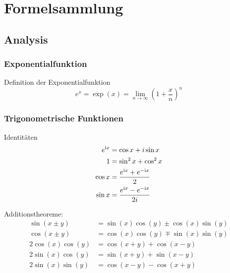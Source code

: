 \section{Formelsammlung}
	\subsection{Analysis}
		\subsubsection{Exponentialfunktion}
			\noindent
			Definition der Exponentialfunktion
			\begin{equation}
				e^x=\exp{(x)}=\lim_{n\rightarrow \infty}\left(1+\frac{x}{n}\right)^n
			\end{equation}

		\subsubsection{Trigonometrische Funktionen}
			\noindent
			Identitäten
			\begin{equation}
				\begin{split}
					e^{\mathrm{i} x}&=\cos x+i\sin x \\
					1&=\sin^{2}x+\cos^{2}x \\
					\cos{x}&=\frac{e^{\mathrm{i} x}+e^{-\mathrm{i} x}}{2} \\
					\sin{ x}&=\frac{e^{\mathrm{i} x}-e^{-\mathrm{i} x}}{2i} \\
				\end{split}
			\end{equation}

			\noindent

			Additionstheoreme:
			\begin{equation}
				\begin{split}
					\sin\left( x\pm y\right)&=\sin\left( x\right)\cos\left( y\right)\pm\cos\left( x\right)\sin\left( y\right) \\
					\cos\left( x\pm y\right)&=\cos\left( x\right)\cos\left( y\right)\mp\sin\left( x\right)\sin\left( y\right) \\
					2\cos( x)\cos( y)&=\cos( x+ y)+\cos( x- y) \\
					2\sin( x)\cos( y)&=\sin( x+ y)+\sin( x- y) \\
					2\sin( x)\sin( y)&=\cos( x- y)-\cos( x+ y) \\
				\end{split}
			\end{equation}

